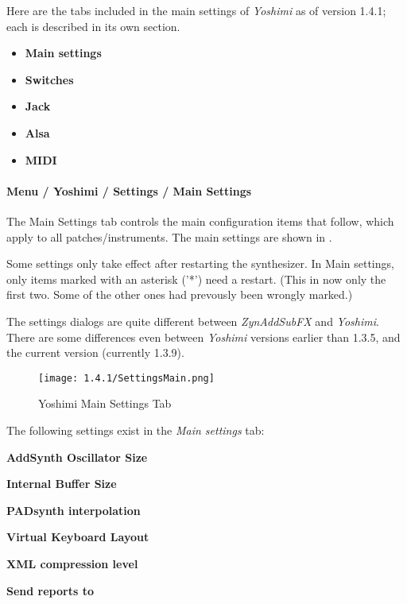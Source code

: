    Here are the tabs included in the main settings of \textsl{Yoshimi}
   as of version 1.4.1; each is described in its own section.

   \begin{itemize}
      \item \textbf{Main settings}
      \item \textbf{Switches}
      \item \textbf{Jack}
      \item \textbf{Alsa}
      \item \textbf{MIDI}
   \end{itemize}

\paragraph{Menu / Yoshimi / Settings / Main Settings}
\label{paragraph:menu_yoshimi_settings_main_settings}

   The Main Settings tab controls the main configuration items that
   follow, which apply to all patches/instruments.
   The main settings are shown in
   .

   Some settings only take effect after restarting the synthesizer.
   In Main settings, only items marked with an asterisk ('*')
   need a restart. 
   (This in now only the first two. Some of the other ones had
   prevously been wrongly marked.)

   The settings dialogs are quite different between \textsl{ZynAddSubFX} and
   \textsl{Yoshimi}.  There are some differences even between
   \textsl{Yoshimi} versions earlier than 1.3.5, and the current version
   (currently 1.3.9).

\begin{figure}[H]
   \centering 
   \texttt{[image: 1.4.1/SettingsMain.png]}
   \caption{Yoshimi Main Settings Tab}
   \label{fig:yoshimi_main_settings_tab}
\end{figure}

   The following settings exist in the \textsl{Main settings} tab:

   \begin{enumber}
      \item \textbf{AddSynth Oscillator Size}
      \item \textbf{Internal Buffer Size}
      \item \textbf{PADsynth interpolation}
      \item \textbf{Virtual Keyboard Layout}
      \item \textbf{XML compression level}
      \item \textbf{Send reports to}
   \end{enumber}


